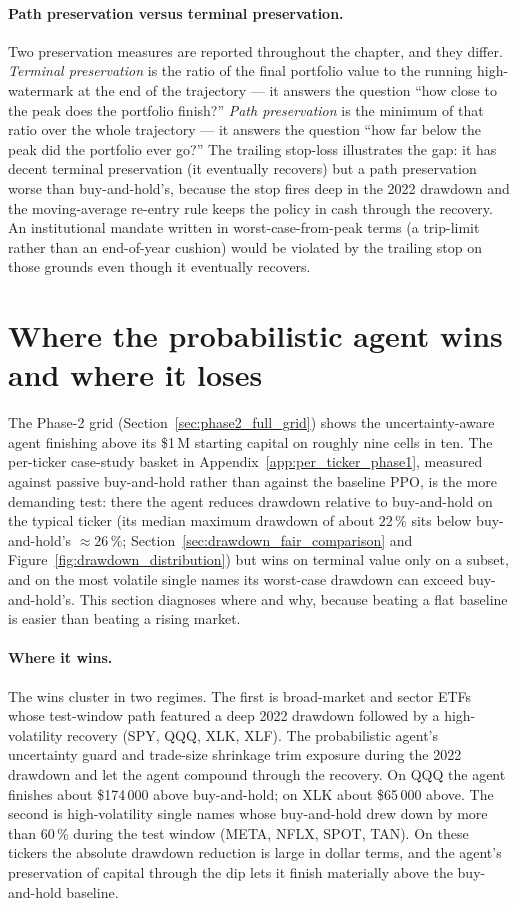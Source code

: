 \paragraph{Path preservation versus terminal preservation.} Two preservation measures are reported throughout the chapter, and they differ. \emph{Terminal preservation} is the ratio of the final portfolio value to the running high-watermark at the end of the trajectory --- it answers the question ``how close to the peak does the portfolio finish?'' \emph{Path preservation} is the minimum of that ratio over the whole trajectory --- it answers the question ``how far below the peak did the portfolio ever go?'' The trailing stop-loss illustrates the gap: it has decent terminal preservation (it eventually recovers) but a path preservation worse than buy-and-hold's, because the stop fires deep in the 2022 drawdown and the moving-average re-entry rule keeps the policy in cash through the recovery. An institutional mandate written in worst-case-from-peak terms (a trip-limit rather than an end-of-year cushion) would be violated by the trailing stop on those grounds even though it eventually recovers.

\section{Where the probabilistic agent wins and where it loses}
\label{sec:wins_and_losses}

The Phase-2 grid (Section~\ref{sec:phase2_full_grid}) shows the uncertainty-aware agent finishing above its \$1\,M starting capital on roughly nine cells in ten. The per-ticker case-study basket in Appendix~\ref{app:per_ticker_phase1}, measured against passive buy-and-hold rather than against the baseline PPO, is the more demanding test: there the agent reduces drawdown relative to buy-and-hold on the typical ticker (its median maximum drawdown of about $22\,\%$ sits below buy-and-hold's $\approx 26\,\%$; Section~\ref{sec:drawdown_fair_comparison} and Figure~\ref{fig:drawdown_distribution}) but wins on terminal value only on a subset, and on the most volatile single names its worst-case drawdown can exceed buy-and-hold's. This section diagnoses where and why, because beating a flat baseline is easier than beating a rising market.

\paragraph{Where it wins.} The wins cluster in two regimes. The first is broad-market and sector ETFs whose test-window path featured a deep 2022 drawdown followed by a high-volatility recovery (SPY, QQQ, XLK, XLF). The probabilistic agent's uncertainty guard and trade-size shrinkage trim exposure during the 2022 drawdown and let the agent compound through the recovery. On QQQ the agent finishes about \$174\,000 above buy-and-hold; on XLK about \$65\,000 above. The second is high-volatility single names whose buy-and-hold drew down by more than 60\,\% during the test window (META, NFLX, SPOT, TAN). On these tickers the absolute drawdown reduction is large in dollar terms, and the agent's preservation of capital through the dip lets it finish materially above the buy-and-hold baseline.

